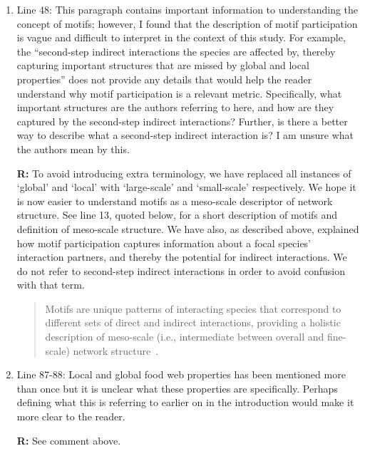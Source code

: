 \documentclass[12pt]{article}
\begin{document}
\begin{enumerate}
            \item Line 48: This paragraph contains important information to understanding the concept of motifs; however, I found that the description of motif participation is vague and difficult to interpret in the context of this study. For example, the ``second-step indirect interactions the species are affected by, thereby capturing important structures that are missed by global and local properties'' does not provide any details that would help the reader understand why motif participation is a relevant metric. Specifically, what important structures are the authors referring to here, and how are they captured by the second-step indirect interactions? Further, is there a better way to describe what a second-step indirect interaction is? I am unsure what the authors mean by this.

                \textbf{R:} To avoid introducing extra terminology, we have replaced all instances of `global' and `local' with `large-scale' and `small-scale' respectively. We hope it is now easier to understand motifs as a meso-scale descriptor of network structure. See line 13, quoted below, for a short description of motifs and definition of meso-scale structure. We have also, as described above, explained how motif participation captures information about a focal species' interaction partners, and thereby the potential for indirect interactions. We do not refer to second-step indirect interactions in order to avoid confusion with that term.


                \begin{quotation}
                    Motifs are unique patterns of interacting species that correspond to different sets of direct and indirect interactions, providing a holistic description of meso-scale (i.e., intermediate between overall and fine-scale) network structure~\citep{Stouffer2007,Stouffer2012}.
                \end{quotation}
            
            \item Line 87-88: Local and global food web properties has been mentioned more than once but it is unclear what these properties are specifically. Perhaps defining what this is referring to earlier on in the introduction would make it more clear to the reader.

                \textbf{R:} See comment above. 


\end{enumerate}
\end{document}
